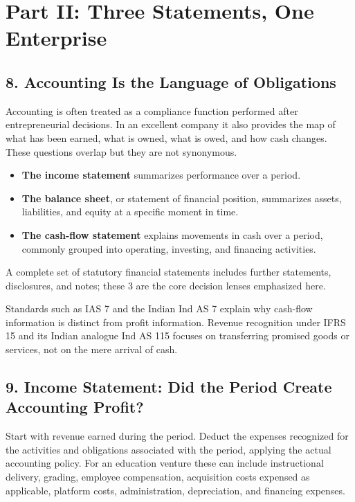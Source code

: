 \section*{Part II: Three Statements, One Enterprise}

\subsection*{8. Accounting Is the Language of Obligations}

Accounting is often treated as a compliance function performed after entrepreneurial decisions. In an excellent company it also provides the map of what has been earned, what is owned, what is owed, and how cash changes. These questions overlap but they are not synonymous.

\begin{itemize}
\item \textbf{The income statement} summarizes performance over a period.
\item \textbf{The balance sheet}, or statement of financial position, summarizes assets, liabilities, and equity at a specific moment in time.
\item \textbf{The cash-flow statement} explains movements in cash over a period, commonly grouped into operating, investing, and financing activities.
\end{itemize}
A complete set of statutory financial statements includes further statements, disclosures, and notes; these 3 are the core decision lenses emphasized here.

Standards such as IAS 7 and the Indian Ind AS 7 explain why cash-flow information is distinct from profit information. Revenue recognition under IFRS 15 and its Indian analogue Ind AS 115 focuses on transferring promised goods or services, not on the mere arrival of cash.

\subsection*{9. Income Statement: Did the Period Create Accounting Profit?}

Start with revenue earned during the period. Deduct the expenses recognized for the activities and obligations associated with the period, applying the actual accounting policy. For an education venture these can include instructional delivery, grading, employee compensation, acquisition costs expensed as applicable, platform costs, administration, depreciation, and financing expenses.

